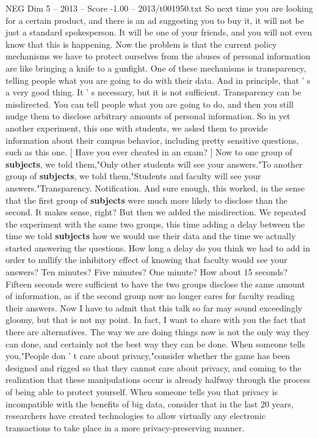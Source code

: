 \begin{textsample}{NEG Dim 5 – 2013 – Score -1.00 – 2013/t001950.txt}
So next time you are looking for a certain product, and there is an ad suggesting you to buy it, it will not be just a standard spokesperson.
It will be one of your friends, and you will not even know that this is happening.
Now the problem is that the current policy mechanisms we have to protect ourselves from the abuses of personal information are like bringing a knife to a gunfight.
One of these mechanisms is transparency, telling people what you are going to do with their data.
And in principle, that ' s a very good thing.
It ' s necessary, but it is not sufficient.
Transparency can be misdirected.
You can tell people what you are going to do, and then you still nudge them to disclose arbitrary amounts of personal information.
So in yet another experiment, this one with students, we asked them to provide information about their campus behavior, including pretty sensitive questions, such as this one. [ Have you ever cheated in an exam? ] Now to one group of \textbf{subjects}, we told them,"Only other students will see your answers."To another group of \textbf{subjects}, we told them,"Students and faculty will see your answers."Transparency.
Notification.
And sure enough, this worked, in the sense that the first group of \textbf{subjects} were much more likely to disclose than the second.
It makes sense, right?
But then we added the misdirection.
We repeated the experiment with the same two groups, this time adding a delay between the time we told \textbf{subjects} how we would use their data and the time we actually started answering the questions.
How long a delay do you think we had to add in order to nullify the inhibitory effect of knowing that faculty would see your answers?
Ten minutes?
Five minutes?
One minute?
How about 15 seconds?
Fifteen seconds were sufficient to have the two groups disclose the same amount of information, as if the second group now no longer cares for faculty reading their answers.
Now I have to admit that this talk so far may sound exceedingly gloomy, but that is not my point.
In fact, I want to share with you the fact that there are alternatives.
The way we are doing things now is not the only way they can done, and certainly not the best way they can be done.
When someone tells you,"People don ' t care about privacy,"consider whether the game has been designed and rigged so that they cannot care about privacy, and coming to the realization that these manipulations occur is already halfway through the process of being able to protect yourself.
When someone tells you that privacy is incompatible with the benefits of big data, consider that in the last 20 years, researchers have created technologies to allow virtually any electronic transactions to take place in a more privacy-preserving manner.

\end{textsample}
